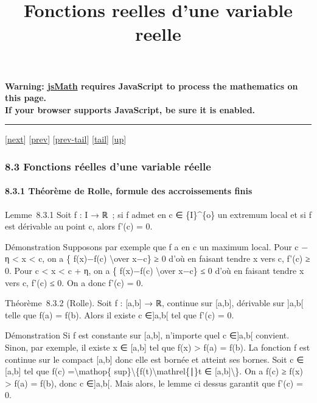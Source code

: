 \documentclass[]{article}
\title{Fonctions reelles d'une variable reelle}
\author{}
\date{}
\begin{document}
\maketitle

\textbf{Warning: \href{http://www.math.union.edu/locate/jsMath}{jsMath}
requires JavaScript to process the mathematics on this page.\\ If your
browser supports JavaScript, be sure it is enabled.}

\begin{center}\rule{3in}{0.4pt}\end{center}

{[}\href{coursse47.html}{next}{]} {[}\href{coursse45.html}{prev}{]}
{[}\href{coursse45.html\#tailcoursse45.html}{prev-tail}{]}
{[}\hyperref[tailcoursse46.html]{tail}{]}
{[}\href{coursch9.html\#coursse46.html}{up}{]}

\subsubsection{8.3 Fonctions réelles d'une variable réelle}

\paragraph{8.3.1 Théorème de Rolle, formule des accroissements finis}

Lemme~8.3.1 Soit f : I → ℝ~; si f admet en c ∈ \{I\}\^{}\{o\} un
extremum local et si f est dérivable au point c, alors f'(c) = 0.

Démonstration Supposons par exemple que f a en c un maximum local. Pour
c − η \textless{} x \textless{} c, on a \{ f(x)−f(c)
\textbackslash{}over x−c\} ≥ 0 d'où en faisant tendre x vers c, f'(c) ≥
0. Pour c \textless{} x \textless{} c + η, on a \{ f(x)−f(c)
\textbackslash{}over x−c\} ≤ 0 d'où en faisant tendre x vers c, f'(c) ≤
0. On a donc f'(c) = 0.

Théorème~8.3.2 (Rolle). Soit f : {[}a,b{]} → ℝ, continue sur {[}a,b{]},
dérivable sur {]}a,b{[} telle que f(a) = f(b). Alors il existe c
∈{]}a,b{[} tel que f'(c) = 0.

Démonstration Si f est constante sur {[}a,b{]}, n'importe quel c
∈{]}a,b{[} convient. Sinon, par exemple, il existe x ∈ {[}a,b{]} tel que
f(x) \textgreater{} f(a) = f(b). La fonction f est continue sur le
compact {[}a,b{]} donc elle est bornée et atteint ses bornes. Soit c ∈
{[}a,b{]} tel que f(c) =\textbackslash{}mathop\{
sup\}\textbackslash{}\{f(t)\textbackslash{}mathrel\{∣\}t ∈
{[}a,b{]}\textbackslash{}\}. On a f(c) ≥ f(x) \textgreater{} f(a) =
f(b), donc c ∈{]}a,b{[}. Mais alors, le lemme ci dessus garantit que
f'(c) = 0.
\end{document}
